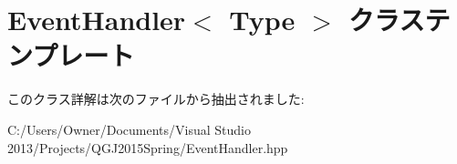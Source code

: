 \hypertarget{class_event_handler}{}\section{Event\+Handler$<$ Type $>$ クラステンプレート}
\label{class_event_handler}


このクラス詳解は次のファイルから抽出されました\+:\begin{DoxyCompactItemize}
\item 
C\+:/\+Users/\+Owner/\+Documents/\+Visual Studio 2013/\+Projects/\+Q\+G\+J2015\+Spring/Event\+Handler.\+hpp\end{DoxyCompactItemize}
